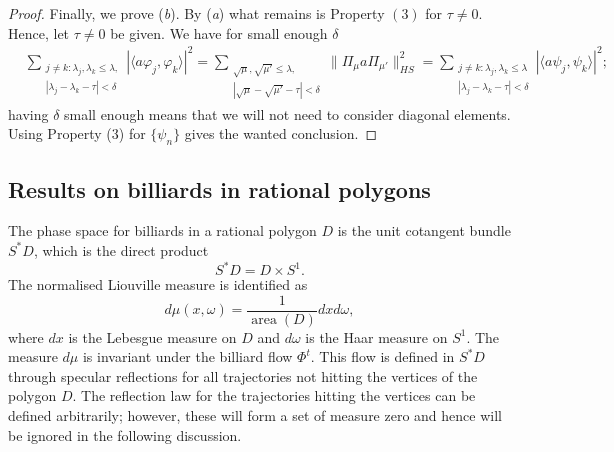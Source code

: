 \documentclass[10pt,a4paper]{amsart}
\renewcommand{\phi}{\varphi}
\newcommand{\1}{\mathrm{\mathbf{1}}}
\DeclareMathOperator{\area}{area}
\numberwithin{equation}{section}
\begin{document}
\begin{proof}
    Finally, we prove (\emph{b}). By (\emph{a}) what remains is Property $(3)$ for $\tau\neq 0$. Hence, let $\tau\neq 0$ be given. We have for small enough $\delta$
    \begin{align*}
        &
        \sum_{ \substack{ j \neq k : \lambda_j , \lambda_k \leq \lambda, \\ | \lambda_j - \lambda_k - \tau| < \delta} } | \langle a \phi_j, \phi_k  \rangle |^2 = \sum_{\substack{ \sqrt{\mu}, \sqrt{\mu'} \leq \lambda, \\ | \sqrt{\mu} - \sqrt{\mu'} - \tau | < \delta }} \| \Pi_\mu a  \Pi_{\mu'} \|_{HS}^2 = \sum_{ \substack{ j \neq k : \lambda_j , \lambda_k \leq \lambda \\ | \lambda_j - \lambda_k - \tau| < \delta} } | \langle a \psi_j, \psi_k  \rangle |^2
        ;
    \end{align*}
    having $\delta$ small enough means that we will not need to consider diagonal elements. Using Property (3) for $\{ \psi_n\}$ gives the wanted conclusion.   
\end{proof}

\subsection{Results on billiards in rational polygons}
The phase space for billiards in a rational polygon $D$ is the unit cotangent bundle $S^{*}D$, which is the direct product 
\begin{equation*}
    S^{*}D = D\times S^1.
\end{equation*}
The normalised Liouville measure is identified as
\begin{equation*}
    d\mu(x,\omega) = \frac{1}{\area(D)} dx d\omega,
\end{equation*}
where $dx$ is the Lebesgue measure on $D$ and $d\omega$ is the Haar measure on $S^1$. The measure $d\mu$ is invariant under the billiard flow $\Phi^t$. This flow is defined in $S^{*}D$ through specular reflections for all trajectories not hitting the vertices of the polygon $D$. The reflection law for the trajectories hitting the vertices can be defined arbitrarily; however, these will form a set of measure zero and hence will be ignored in the following discussion. 
\end{document}
